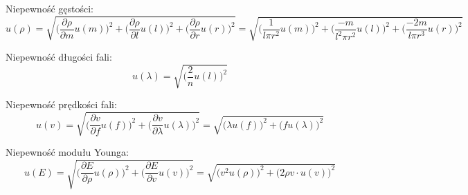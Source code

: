 \documentclass{article}
\begin{document}
	Niepewność gęstości:
	\[
	u(\rho)=\sqrt{\bigg(\frac{\partial \rho}{\partial m}u(m)\bigg)^2+\bigg(\frac{\partial \rho}{\partial l}u(l)\bigg)^2+\bigg(\frac{\partial \rho}{\partial r}u(r)\bigg)^2} = \sqrt{\bigg(\frac{1}{l\pi r^2}u(m)\bigg)^2+\bigg(\frac{-m}{l^2 \pi r^2}u(l)\bigg)^2+\bigg(\frac{-2m}{l\pi r^3}u(r)\bigg)^2}
	\]
	
	Niepewność długości fali:
	$$ u(\lambda)=\sqrt{\bigg(\frac{2}{n}u(l)\bigg)^2}$$
	
	Niepewność prędkości fali:
	$$ u(v)=\sqrt{\bigg(\frac{\partial v}{\partial f}u(f)\bigg)^2+\bigg(\frac{\partial v}{\partial \lambda}u(\lambda)\bigg)^2}=\sqrt{\bigg(\lambda u(f)\bigg)^2+\bigg(f u(\lambda)\bigg)^2}$$
	
	Niepewność modułu Younga:
	$$ u(E)=\sqrt{\bigg(\frac{\partial E}{\partial \rho}u(\rho)\bigg)^2+\bigg(\frac{\partial E}{\partial v}u(v)\bigg)^2} =
	\sqrt{\bigg(v^2 u(\rho)\bigg)^2+\bigg(2 \rho v  \cdot{}u(v)\bigg)^2}$$
	
\end{document}
